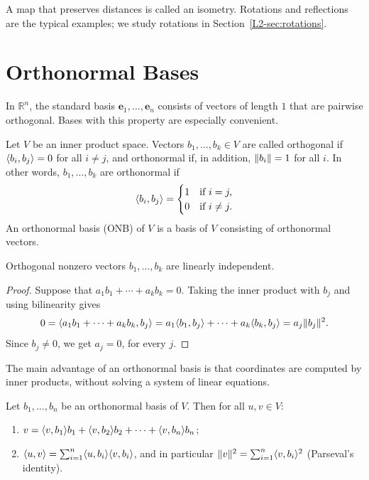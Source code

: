 A map that preserves distances is called an isometry. Rotations and reflections are the typical examples; we study rotations in Section~\ref{L2-sec:rotations}.

\section{Orthonormal Bases}

In $\mathbb{R}^n$, the standard basis $\mathbf{e}_1, \ldots, \mathbf{e}_n$ consists of vectors of length $1$ that are pairwise orthogonal. Bases with this property are especially convenient.

\begin{definition}
    Let $V$ be an inner product space. Vectors $b_1, \ldots, b_k \in V$ are called orthogonal if $\langle b_i, b_j \rangle = 0$ for all $i \neq j$, and orthonormal if, in addition, $\lVert b_i \rVert = 1$ for all $i$. In other words, $b_1, \ldots, b_k$ are orthonormal if
    \[\langle b_i, b_j \rangle = \begin{cases} 1 & \text{if } i = j, \\ 0 & \text{if } i \neq j. \end{cases}\]
    An orthonormal basis (ONB) of $V$ is a basis of $V$ consisting of orthonormal vectors.
\end{definition}

\begin{lemma}\label{L2-lem:orth-indep}
    Orthogonal nonzero vectors $b_1, \ldots, b_k$ are linearly independent.
\end{lemma}

\begin{proof}
    Suppose that $a_1 b_1 + \cdots + a_k b_k = 0$. Taking the inner product with $b_j$ and using bilinearity gives
    \[0 = \langle a_1 b_1 + \cdots + a_k b_k, b_j \rangle = a_1 \langle b_1, b_j \rangle + \cdots + a_k \langle b_k, b_j \rangle = a_j \lVert b_j \rVert^2.\]
    Since $b_j \neq 0$, we get $a_j = 0$, for every $j$.
\end{proof}

The main advantage of an orthonormal basis is that coordinates are computed by inner products, without solving a system of linear equations.

\begin{proposition}\label{L2-prop:onb-coordinates}
    Let $b_1, \ldots, b_n$ be an orthonormal basis of $V$. Then for all $u, v \in V$:
    \begin{enumerate}
        \item $v = \langle v, b_1 \rangle b_1 + \langle v, b_2 \rangle b_2 + \cdots + \langle v, b_n \rangle b_n$;
        \item $\langle u, v \rangle = \sum_{i=1}^n \langle u, b_i \rangle \langle v, b_i \rangle$, and in particular $\lVert v \rVert^2 = \sum_{i=1}^n \langle v, b_i \rangle^2$ (Parseval's identity).
    \end{enumerate}
\end{proposition}

